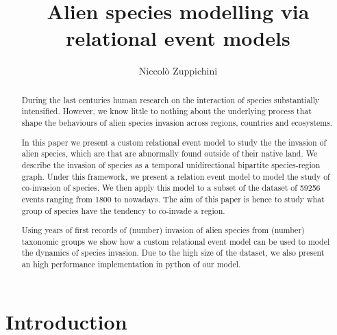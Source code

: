 \documentclass[mscthesis]{usiinfthesis}
\title{Alien species modelling via relational event models} %
\author{Niccol\`o Zuppichini} %
\newcommand\numberevents{59256 }
\begin{document}
\maketitle %

\frontmatter %

\begin{abstract}
During the last centuries human research on the interaction of species substantially intensified. However, we know little to nothing about the underlying process that shape the behaviours of alien species invasion across regions, countries and ecosystems.

In this paper we present a custom relational event model to study the the invasion of alien species, which are that are abnormally found outside of their native land. We describe the invasion of species as a temporal unidirectional bipartite species-region graph. Under this framework, we present a relation event model to model the study of co-invasion of species. We then apply this model to a subset of the dataset of \numberevents events ranging from 1800 to nowadays. The aim of this paper is hence to study what group of species have the tendency to co-invade a region.

Using years of first records of (number) invasion of alien species from (number) taxonomic groups we show how a custom relational event model can be used to model the dynamics of species invasion. Due to the high size of the dataset, we also present an high performance implementation in python of our model.


\end{abstract}



\mainmatter

\chapter{Introduction}
\end{document}
